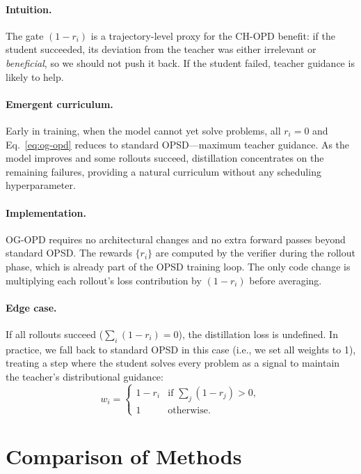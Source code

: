 \documentclass[11pt]{article}
\begin{document}
\paragraph{Intuition.}
The gate $(1-r_i)$ is a trajectory-level proxy for the CH-OPD benefit: if the student
succeeded, its deviation from the teacher was either irrelevant or \emph{beneficial}, so we
should not push it back.  If the student failed, teacher guidance is likely to help.

\paragraph{Emergent curriculum.}
Early in training, when the model cannot yet solve problems, all $r_i = 0$ and
Eq.~\eqref{eq:og-opd} reduces to standard OPSD—maximum teacher guidance.  As the model
improves and some rollouts succeed, distillation concentrates on the remaining failures,
providing a natural curriculum without any scheduling hyperparameter.

\paragraph{Implementation.}
OG-OPD requires no architectural changes and no extra forward passes beyond standard OPSD.
The rewards $\{r_i\}$ are computed by the verifier during the rollout phase, which is
already part of the OPSD training loop.  The only code change is multiplying each rollout's
loss contribution by $(1-r_i)$ before averaging.

\paragraph{Edge case.}
If all rollouts succeed ($\sum_i (1-r_i) = 0$), the distillation loss is undefined.
In practice, we fall back to standard OPSD in this case (i.e., we set all weights to 1),
treating a step where the student solves every problem as a signal to maintain the
teacher's distributional guidance:
\begin{equation}
  w_i = \begin{cases}1 - r_i & \text{if } \sum_j (1-r_j) > 0, \\ 1 & \text{otherwise.}\end{cases}
\end{equation}

\section{Comparison of Methods}
\label{sec:comparison}
\end{document}
